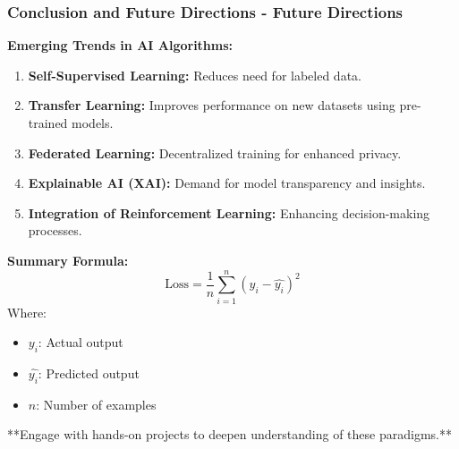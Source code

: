 \documentclass{beamer}
\begin{document}
\begin{frame}[fragile]
    \frametitle{Conclusion and Future Directions - Future Directions}
    
    \textbf{Emerging Trends in AI Algorithms:}
    \begin{enumerate}
        \item \textbf{Self-Supervised Learning:} Reduces need for labeled data.
        \item \textbf{Transfer Learning:} Improves performance on new datasets using pre-trained models.
        \item \textbf{Federated Learning:} Decentralized training for enhanced privacy.
        \item \textbf{Explainable AI (XAI):} Demand for model transparency and insights.
        \item \textbf{Integration of Reinforcement Learning:} Enhancing decision-making processes.
    \end{enumerate}

    \textbf{Summary Formula:}
    \begin{equation}
    \text{Loss} = \frac{1}{n} \sum_{i=1}^{n} (y_i - \hat{y_i})^2 
    \end{equation}
    Where:
    \begin{itemize}
        \item \( y_i \): Actual output
        \item \( \hat{y_i} \): Predicted output
        \item \( n \): Number of examples
    \end{itemize}

    **Engage with hands-on projects to deepen understanding of these paradigms.**
\end{frame}
\end{document}
